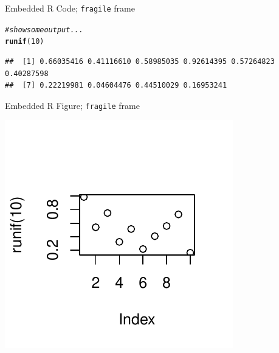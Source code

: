 \documentclass[12pt]{beamer}\usepackage[]{graphicx}\usepackage[]{color}
\makeatletter
\def\maxwidth{ %
  \ifdim\Gin@nat@width>\linewidth
    \linewidth
  \else
    \Gin@nat@width
  \fi
}
\newcommand{\hlnum}[1]{\textcolor[rgb]{0.686,0.059,0.569}{#1}}%
\newcommand{\hlcom}[1]{\textcolor[rgb]{0.678,0.584,0.686}{\textit{#1}}}%
\newcommand{\hlstd}[1]{\textcolor[rgb]{0.345,0.345,0.345}{#1}}%
\newcommand{\hlkwd}[1]{\textcolor[rgb]{0.737,0.353,0.396}{\textbf{#1}}}%
\newenvironment{kframe}{%
 \def\at@end@of@kframe{}%
 \ifinner\ifhmode%
  \def\at@end@of@kframe{\end{minipage}}%
  \begin{minipage}{\columnwidth}%
 \fi\fi%
 \def\FrameCommand##1{\hskip\@totalleftmargin \hskip-\fboxsep
 \colorbox{shadecolor}{##1}\hskip-\fboxsep
     \hskip-\linewidth \hskip-\@totalleftmargin \hskip\columnwidth}%
 \MakeFramed {\advance\hsize-\width
   \@totalleftmargin\z@ \linewidth\hsize
   \@setminipage}}%
 {\par\unskip\endMakeFramed%
 \at@end@of@kframe}
\newenvironment{knitrout}{}{} %
\makeatother
\begin{document}
\begin{frame}[fragile]{Embedded R Code; \texttt{fragile} frame}
\begin{block}

\begin{knitrout}
\color{fgcolor}\begin{kframe}
\begin{alltt}
\hlcom{# show some output...}
\hlkwd{runif}\hlstd{(}\hlnum{10}\hlstd{)}
\end{alltt}
\begin{verbatim}
##  [1] 0.66035416 0.41116610 0.58985035 0.92614395 0.57264823 0.40287598
##  [7] 0.22219981 0.04604476 0.44510029 0.16953241
\end{verbatim}
\end{kframe}
\end{knitrout}

\end{block}
\end{frame}

\begin{frame}[fragile]{Embedded R Figure; \texttt{fragile} frame}

\begin{knitrout}
\color{fgcolor}

{\centering \includegraphics[width=\maxwidth]{figure/unnamed-chunk-2-1} 

}



\end{knitrout}

\end{frame}
\end{document}
